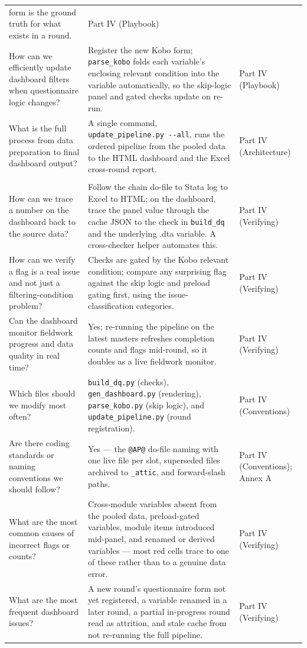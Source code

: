 \begin{longtable}{>{\raggedright\arraybackslash}p{5.1cm} >{\raggedright\arraybackslash}p{7.4cm} >{\raggedright\arraybackslash}p{2.2cm}}
form is the ground truth for what exists in a round. &
Part IV (Playbook) \\[0.4em]
How can we efficiently update dashboard filters when questionnaire logic
changes? &
Register the new Kobo form; \texttt{parse\_kobo} folds each variable's enclosing
relevant condition into the variable automatically, so the skip-logic panel and
gated checks update on re-run. &
Part IV (Playbook) \\[0.4em]
What is the full process from data preparation to final dashboard output? &
A single command, \texttt{update\_pipeline.py -{}-all}, runs the ordered
pipeline from the pooled data to the HTML dashboard and the Excel cross-round
report. &
Part IV (Architecture) \\[0.4em]
\midrule
\multicolumn{3}{@{}l}{\textbf{Other}} \\
How can we trace a number on the dashboard back to the source data? &
Follow the chain do-file to Stata log to Excel to HTML; on the dashboard, trace
the panel value through the cache JSON to the check in \texttt{build\_dq} and
the underlying .dta variable. A cross-checker helper automates this. &
Part IV (Verifying) \\[0.4em]
How can we verify a flag is a real issue and not just a filtering-condition
problem? &
Checks are gated by the Kobo relevant condition; compare any surprising flag
against the skip logic and preload gating first, using the issue-classification
categories. &
Part IV (Verifying) \\[0.4em]
Can the dashboard monitor fieldwork progress and data quality in real time? &
Yes; re-running the pipeline on the latest masters refreshes completion counts
and flags mid-round, so it doubles as a live fieldwork monitor. &
Part IV (Verifying) \\[0.4em]
Which files should we modify most often? &
\texttt{build\_dq.py} (checks), \texttt{gen\_dashboard.py} (rendering),
\texttt{parse\_kobo.py} (skip logic), and \texttt{update\_pipeline.py} (round
registration). &
Part IV (Conventions) \\[0.4em]
Are there coding standards or naming conventions we should follow? &
Yes --- the \texttt{@AP@} do-file naming with one live file per slot,
superseded files archived to \texttt{\_attic}, and forward-slash paths. &
Part IV (Conventions); Annex A \\[0.4em]
What are the most common causes of incorrect flags or counts? &
Cross-module variables absent from the pooled data, preload-gated variables,
module items introduced mid-panel, and renamed or derived variables --- most
red cells trace to one of these rather than to a genuine data error. &
Part IV (Verifying) \\[0.4em]
What are the most frequent dashboard issues? &
A new round's questionnaire form not yet registered, a variable renamed in a
later round, a partial in-progress round read as attrition, and stale cache
from not re-running the full pipeline. &
Part IV (Verifying) \\
\bottomrule
\end{longtable}
\normalsize
